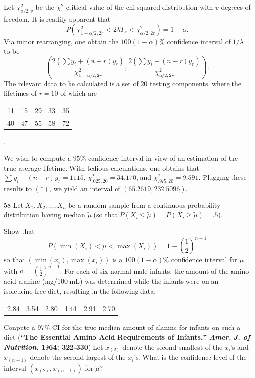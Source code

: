 \documentclass{exam}
\newcommand{\paren}[1]{\left(#1\right)}
\begin{document}
Let $\chi^2_{\alpha/2, v}$ be the $\chi^2$ critical value of the chi-squared distribution with $v$ degrees of freedom. It is readily apparent that
\[
	P\paren{\chi^2_{1 - \alpha/2, 2r} < 2\lambda T_r < \chi^2_{\alpha/2, 2r}} = 1 - \alpha.
\]
Via minor rearranging, one obtain the $100(1 - \alpha)\%$ confidence interval of $1/\lambda$ to be
\[
	\paren{\frac{2(\sum y_i + (n - r)y_r)}{\chi^2_{1 - \alpha/2, 2r}}, \frac{2(\sum y_i + (n - r)y_r)}{\chi^2_{\alpha/2, 2r}}}. \tag{$*$}
\]
The relevant data to be calculated is a set of $20$ testing components, where the lifetimes of $r = 10$ of which are
\begin{center}
	\bgroup
	\def\arraystretch{1.2}
	\begin{tabular}{ccccc}
		11 & 15 & 29 & 33 & 35 \\
		40 & 47 & 55 & 58 & 72
	\end{tabular}.
	\egroup
\end{center}
We wish to compute a $95\%$ confidence interval in view of an estimation of the true average lifetime. With tedious calculations, one obtains that $\sum y_i + (n - r)y_r = 1115$, $\chi^2_{.025, 20} = 34.170$, and $\chi^2_{.975, 20} = 9.591$. Plugging these results to $(*)$, we yield an interval of $(65.2619, 232.5096)$.

\begin{problem}{58}
	Let $X_1, X_2, \dots, X_n$ be a random sample from a continuous probability distribution having median $\widetilde{\mu}$ (so that $P(X_i \le \widetilde{\mu}) = P(X_i \ge \widetilde{\mu}) = .5$).
	\begin{tasks}[label=\textbf{\alph*.}]
		\task Show that
		\[
			P(\min(X_i) < \widetilde{\mu} < \max(X_i)) = 1 - \paren{\frac12}^{n - 1}
		\]
		so that $(\min(x_i), \max(x_i))$ is a $100(1 - \alpha)\%$ confidence interval for $\widetilde{\mu}$ with $\alpha = \paren{\frac12}^{n - 1}$.
		\task For each of six normal male infants, the amount of the amino acid alanine (mg/100 mL) was determined while the infants were on an isoleucine-free diet, resulting in the following data:
		\begin{center}
			\bgroup
			\def\arraystretch{1.5}
			\begin{tabular}{cccccc}
				2.84 & 3.54 & 2.80 & 1.44 & 2.94 & 2.70
			\end{tabular}
			\egroup
		\end{center}
		Conpute a 97\% CI for the true median amount of alanine for infants on such a diet (\textbf{``The Essential Amino Acid Requirements of Infants,'' \textit{Amer. J. of Nutrition}, 1964: 322-330})
		\task Let $x_{(2)}$ denote the second smallest of the $x_i$'s and $x_{(n - 1)}$ denote the second largest of the $x_i$'s. What is the confidence level of the interval $(x_{(2)}, x_{(n - 1)})$ for $\widetilde{\mu}$?
	\end{tasks}
\end{problem}
\end{document}
